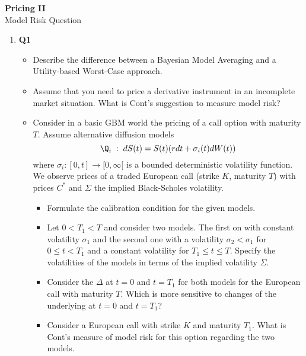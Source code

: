 \documentclass[11pt,a4paper,titlepage]{article}
\begin{document}
\setlength{\topmargin}{-2.5cm}


\begin{center} {\LARGE \bf Pricing II } \\[5mm]
                {\large Model Risk Question }
\end{center}


\vspace{0.3cm}

\pagestyle{empty}


\begin{enumerate}

\vspace{0.3cm}

\item[]{\bf Q1} 

\begin{itemize}
\item[(a)]
Describe the difference between a Bayesian Model Averaging and a Utility-based Worst-Case
approach. 
\item[(b)] Assume that you need to price a derivative instrument in an incomplete market situation. What is Cont's suggestion to measure model risk?
\item[(c)] 
Consider in a basic GBM world the pricing of a call option with maturity $T$. 
Assume alternative diffusion models
\begin{equation}
\Q_i\;:\; dS(t) = S(t)(r dt + \sigma_i(t) dW(t))
\end{equation}
where $ \sigma_i: [0,t] \rightarrow [0, \infty[ $ is a bounded deterministic volatility function.
We observe prices of a traded European call (strike $K$, maturity $T$) with prices $C^*$ and
$\Sigma$ the implied Black-Scholes volatility.
\begin{itemize}
\item[(i)]
Formulate the calibration condition for the given models.
\item[(ii)]
Let $0< T_1 <T$ and consider two models. The first on with constant volatility $\sigma_1$ and the second one with a volatility $\sigma_2 < \sigma _1$ for $0 \leq t <T_1$ and a constant volatility for $T_1\leq t \leq T$. Specify  the  volatilities of the models in terms of the implied volatility $\Sigma $.
\item[(iii)]
Consider the $\Delta$ at $t=0$ and $t=T_1$ for both models for the European call with maturity $T$. Which is more sensitive to changes of the underlying at $t=0$ and $t=T_1$? 
\item[(iv)]
Consider  a  European call with strike $K$ and maturity $T_1$. What is Cont's measure of model risk for this option regarding the two models. 
\end{itemize}
\end{itemize}


\end{enumerate}
\end{document}
